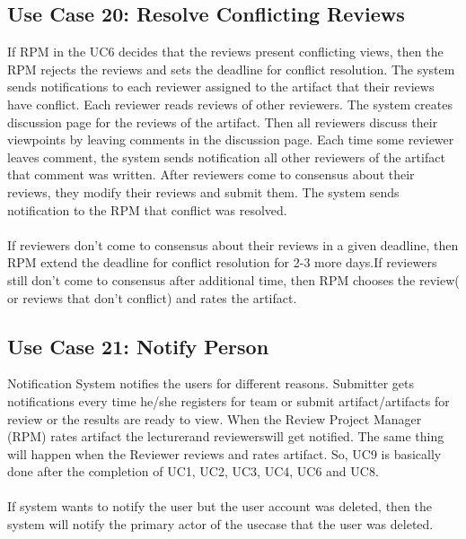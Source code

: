    \subsection*{Use Case 20: Resolve Conflicting Reviews}
    If RPM in the UC6 decides that the reviews present conflicting views, then the RPM rejects the reviews and sets the deadline for conflict resolution. The system sends notifications to each reviewer assigned to the artifact that their reviews have conflict. Each reviewer reads reviews of other reviewers. The system creates discussion page for the reviews of the artifact. Then all reviewers discuss their viewpoints by leaving comments in the discussion page. Each time some reviewer leaves comment, the system sends notification all other reviewers of the artifact that comment was written. After reviewers come to consensus about their reviews, they modify their reviews and submit them. The system sends notification to the RPM that conflict was resolved.
    \\
    \\
    If reviewers don’t come to consensus about their reviews in a given deadline, then RPM extend the deadline for conflict resolution for 2-3 more days.If reviewers still don’t come to consensus after additional time, then RPM chooses the review( or reviews that don’t conflict) and rates the artifact.
    
    
    
    
    \subsection*{Use Case 21: Notify Person }
    Notification System notifies the users for different reasons. Submitter gets notifications every time he/she registers for team or submit artifact/artifacts for review or the results are ready to view. When the Review Project Manager (RPM) rates artifact the lecturerand reviewerswill get notified. The same thing will happen when the Reviewer reviews and rates artifact. So, UC9 is basically done after the completion of UC1, UC2, UC3, UC4, UC6 and UC8.
    \\
    \\
    If system wants to notify the user but the user account was deleted, then the system will notify the primary actor of the usecase that the user was deleted.
    
    
    
    

